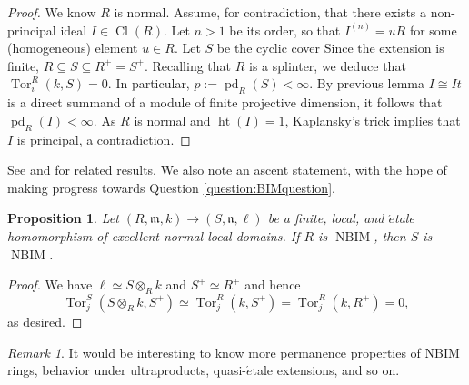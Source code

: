 \documentclass[12pt,reqno]{amsart}
\newtheorem{proposition}[theorem]{Proposition}
\theoremstyle{definition}
\theoremstyle{remark}
\newtheorem{remark}[theorem]{Remark}
\theoremstyle{cited}
\theoremstyle{remark}
\theoremstyle{citeddef}
\DeclareMathOperator{\Tor}{Tor}
\DeclareMathOperator{\height}{ht}
\DeclareMathOperator{\NBIM}{NBIM}
\newcommand{\Cl}{\operatorname{Cl}}
\newcommand{\fm}{\mathfrak{m}}
\newcommand{\fn}{\mathfrak{n}}
\begin{document}
	\begin{proof}
		We know $R$ is normal.  
		Assume, for contradiction, that there exists a non-principal ideal \( I \in \Cl(R) \). Let \( n >1\) be its order, so that \( I^{(n)} = uR \) for some (homogeneous) element \( u \in R \). Let $S$ be the cyclic cover 
		Since the extension is finite, \( R \subseteq S \subseteq R^+ = S^+ \). Recalling that \( R \) is a splinter, we deduce that \( \Tor_i^R(k,S) = 0 \). 
		In particular, \( p := \operatorname{pd}_R(S) < \infty \). By previous lemma \( I \cong It \) is a direct summand of a module of finite projective dimension, it follows that \( \operatorname{pd}_R(I) < \infty \). As \( R \) is normal and \( \height(I) = 1 \), Kaplansky's trick implies that \( I \) is principal, a contradiction. %
	\end{proof}
	
	See \cite{Tavanfar} and \cite[Corollary 4.1]{Tavanfar} for related results. We also note an ascent statement, with the hope of making progress towards Question \ref{question:BIMquestion}.
	
	\begin{proposition}\label{prop:nbim-etale-ascent}
		Let
		\( 
		(R,\fm,k)\to(S,\fn,\ell)
		\)
		be a finite, local, and \(\acute{e}\)tale homomorphism of excellent normal
		local domains. If $R$ is $\NBIM$, then $S$ is $\NBIM$.
	\end{proposition}
	
	\begin{proof}
		We have $\ell \simeq S\otimes_{R} k$ and $S^{+} \simeq R^{+}$ and hence $$\Tor_{j}^{S}(S\otimes_{R}k,S^{+})\simeq \Tor_{j}^{R}(k,S^{+})=\Tor_{j}^{R}(k,R^{+})=0,$$
		as desired.\end{proof}
	
	\begin{remark}
		It would be interesting to know more permanence properties of NBIM rings, behavior under ultraproducts, quasi-\(\acute{e}\)tale extensions, and so on.
	\end{remark}
	
\end{document}
